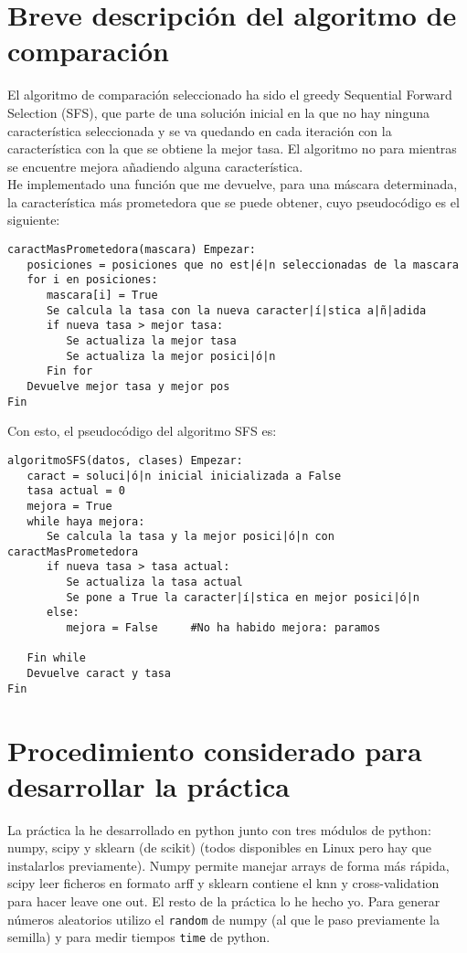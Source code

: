 \documentclass[12pt]{article}
\begin{document}
\newpage

\section{Breve descripción del algoritmo de comparación}
El algoritmo de comparación seleccionado ha sido el greedy Sequential Forward Selection (SFS), que parte de una solución inicial en la que no hay ninguna característica seleccionada y se va quedando en cada iteración con la característica con la que se obtiene la mejor tasa. El algoritmo no para mientras se encuentre mejora añadiendo alguna característica.\\
He implementado una función que me devuelve, para una máscara determinada, la característica más prometedora que se puede obtener, cuyo pseudocódigo es el siguiente:
\begin{lstlisting}
caractMasPrometedora(mascara) Empezar:
   posiciones = posiciones que no est|é|n seleccionadas de la mascara
   for i en posiciones:
      mascara[i] = True
      Se calcula la tasa con la nueva caracter|í|stica a|ñ|adida
      if nueva tasa > mejor tasa:
         Se actualiza la mejor tasa
         Se actualiza la mejor posici|ó|n
      Fin for
   Devuelve mejor tasa y mejor pos
Fin
\end{lstlisting}

Con esto, el pseudocódigo del algoritmo SFS es:
\begin{lstlisting}
algoritmoSFS(datos, clases) Empezar:
   caract = soluci|ó|n inicial inicializada a False
   tasa actual = 0
   mejora = True
   while haya mejora:
      Se calcula la tasa y la mejor posici|ó|n con caractMasPrometedora
      if nueva tasa > tasa actual:
         Se actualiza la tasa actual
         Se pone a True la caracter|í|stica en mejor posici|ó|n
      else:
         mejora = False		#No ha habido mejora: paramos
      
   Fin while
   Devuelve caract y tasa
Fin

\end{lstlisting}

\newpage

\section{Procedimiento considerado para desarrollar la práctica}
La práctica la he desarrollado en python junto con tres módulos de python: numpy, scipy y sklearn (de scikit) (todos disponibles en Linux pero hay que instalarlos previamente). Numpy permite manejar arrays de forma más rápida, scipy leer ficheros en formato arff y sklearn contiene el knn y cross-validation para hacer leave one out. El resto de la práctica lo he hecho yo. Para generar números aleatorios utilizo el \texttt{random} de numpy (al que le paso previamente la semilla) y para medir tiempos \texttt{time} de python.\\
\end{document}
